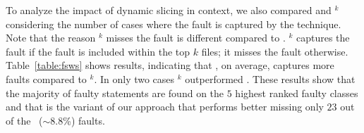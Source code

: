 \documentclass{article}
\begin{document}


To analyze the impact of dynamic slicing in context, we also compared
 and \sfl{}$^{k}$ considering the number of cases where the
fault is captured by the technique. Note that the reason \sfl{}$^{k}$
misses the fault is different compared to . \sfl{}$^{k}$
captures the fault if the fault is included within the top $k$ files;
it misses the fault otherwise. Table~\ref{table:fsws} shows results,
indicating that , on average, captures more faults compared
to \sfl{}$^{k}$. In only two cases \sfl{}$^{k}$ outperformed
. These results show that the majority of faulty statements
are found on the $5$ highest ranked faulty classes and that
 is the variant of our approach that performs better
missing only $23$ out of the \numFaults\ ($\sim$8.8\%) faults.

\end{document}
